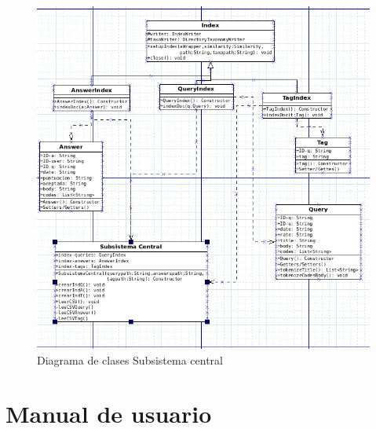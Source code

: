 \begin{figure}[H] %
	\centering
	\includegraphics[scale=0.5]{dcsc.png}  %
	\caption{Diagrama de clases Subsistema central} 
\end{figure}





\newpage
\section{Manual de usuario}

